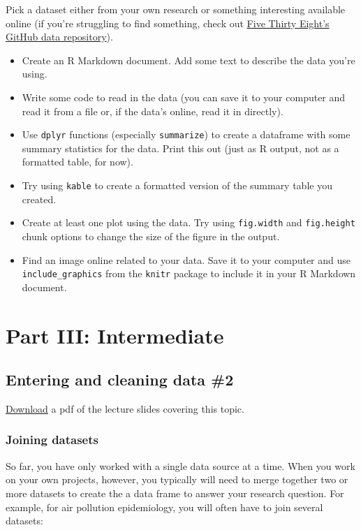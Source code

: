 \documentclass[]{book}
\providecommand{\tightlist}{%
  \setlength{\itemsep}{0pt}\setlength{\parskip}{0pt}}
\theoremstyle{definition}
\theoremstyle{definition}
\theoremstyle{definition}
\theoremstyle{remark}
\begin{document}
Pick a dataset either from your own research or something interesting
available online (if you're struggling to find something, check out
\href{https://github.com/fivethirtyeight/data}{Five Thirty Eight's
GitHub data repository}).

\begin{itemize}
\tightlist
\item
  Create an R Markdown document. Add some text to describe the data
  you're using.
\item
  Write some code to read in the data (you can save it to your computer
  and read it from a file or, if the data's online, read it in
  directly).
\item
  Use \texttt{dplyr} functions (especially \texttt{summarize}) to create
  a dataframe with some summary statistics for the data. Print this out
  (just as R output, not as a formatted table, for now).
\item
  Try using \texttt{kable} to create a formatted version of the summary
  table you created.
\item
  Create at least one plot using the data. Try using \texttt{fig.width}
  and \texttt{fig.height} chunk options to change the size of the figure
  in the output.
\item
  Find an image online related to your data. Save it to your computer
  and use \texttt{include\_graphics} from the \texttt{knitr} package to
  include it in your R Markdown document.
\end{itemize}

\part{Part III:
Intermediate}\label{part-part-iii-intermediate}

\chapter{Entering and cleaning data
\#2}\label{entering-and-cleaning-data-2}

\href{https://github.com/geanders/RProgrammingForResearch/raw/master/slides/CourseNotes_Week6.pdf}{Download}
a pdf of the lecture slides covering this topic.

\section{Joining datasets}\label{joining-datasets}

So far, you have only worked with a single data source at a time. When
you work on your own projects, however, you typically will need to merge
together two or more datasets to create the a data frame to answer your
research question. For example, for air pollution epidemiology, you will
often have to join several datasets:
\end{document}
